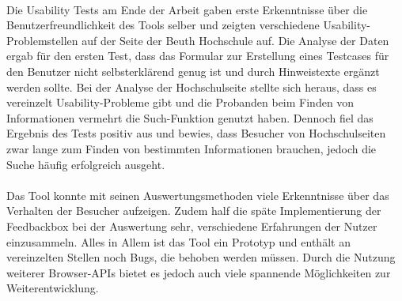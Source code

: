 \\
Die Usability Tests am Ende der Arbeit gaben erste Erkenntnisse über die Benutzerfreundlichkeit des Tools selber und zeigten verschiedene Usability-Problemstellen auf der Seite der Beuth Hochschule auf. Die Analyse der Daten ergab für den ersten Test, dass das Formular zur Erstellung eines Testcases für den Benutzer nicht selbsterklärend genug ist und durch Hinweistexte ergänzt werden sollte. Bei der Analyse der Hochschulseite stellte sich heraus, dass es vereinzelt Usability-Probleme gibt und die Probanden beim Finden von Informationen vermehrt die Such-Funktion genutzt haben. Dennoch fiel das Ergebnis des Tests positiv aus und bewies, dass Besucher von Hochschulseiten zwar lange zum Finden von bestimmten Informationen brauchen, jedoch die Suche häufig erfolgreich ausgeht.\\
\\
Das Tool konnte mit seinen Auswertungsmethoden viele Erkenntnisse über das Verhalten der Besucher aufzeigen. Zudem half die späte Implementierung der Feedbackbox bei der Auswertung sehr, verschiedene Erfahrungen der Nutzer einzusammeln. Alles in Allem ist das Tool ein Prototyp und enthält an vereinzelten Stellen noch Bugs, die behoben werden müssen. Durch die Nutzung weiterer Browser-APIs bietet es jedoch auch viele spannende Möglichkeiten zur Weiterentwicklung.